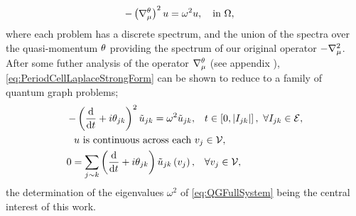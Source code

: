\begin{align} \label{eq:PeriodCellLaplaceStrongForm}
	-\left( \nabla^{\theta}_{\mu} \right)^2 u &= \omega^2 u, \quad\text{in } \Omega,
\end{align}
where each problem has a discrete spectrum, and the union of the spectra over the quasi-momentum $\theta$ providing the spectrum of our original operator $-\nabla_{\mu}^2$.
After some futher analysis of the operator $\nabla^{\theta}_{\mu}$ (see appendix ), \eqref{eq:PeriodCellLaplaceStrongForm} can be shown to reduce to a family of quantum graph problems; 
\begin{subequations} \label{eq:QGFullSystem}
	\begin{align}
		-\left( \dfrac{\mathrm{d}}{\mathrm{d}t} + i\theta_{jk} \right)^2 \tilde{u}_{jk} = \omega^2 \tilde{u}_{jk}, &\quad t\in\left[ 0,\left\lvert I_{jk} \right\rvert \right], \ \forall I_{jk}\in \mathcal{E}, \label{eq:QGEdgeODEs} \\
		u \text{ is continuous across each } &v_j \in \mathcal{V}, \label{eq:QGVertCty }\\
		0 = \sum_{j\sim k}\left( \dfrac{\mathrm{d}}{\mathrm{d}t} + i\theta_{jk} \right)\tilde{u}_{jk}\left( v_j \right), &\quad \forall v_j \in \mathcal{V}, \label{eq:QGDerivCondition}
	\end{align}
\end{subequations}
the determination of the eigenvalues $\omega^2$ of \eqref{eq:QGFullSystem} being the central interest of this work.

